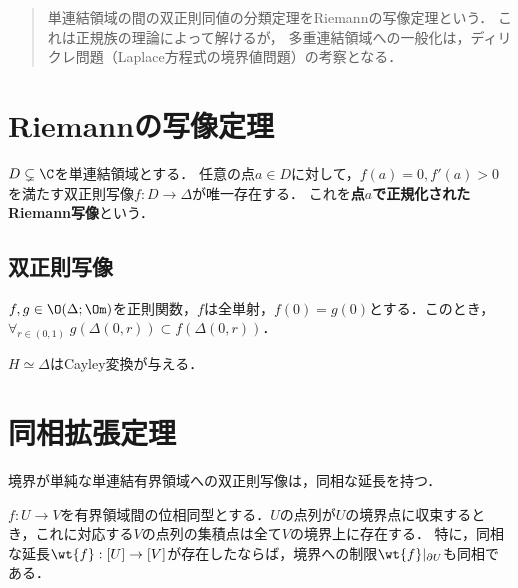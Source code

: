 \documentclass[uplatex, dvipdfmx]{jsreport}
\begin{document}
\begin{quotation}
    単連結領域の間の双正則同値の分類定理をRiemannの写像定理という．
    これは正規族の理論によって解けるが，
    多重連結領域への一般化は，ディリクレ問題（Laplace方程式の境界値問題）の考察となる．
\end{quotation}

\section{Riemannの写像定理}

\begin{theorem}
    $D\subsetneq\C$を単連結領域とする．
    任意の点$a\in D$に対して，$f(a)=0,f'(a)>0$を満たす双正則写像$f:D\to\Delta$が唯一存在する．
    これを\textbf{点$a$で正規化されたRiemann写像}という．
\end{theorem}

\subsection{双正則写像}

\begin{proposition}[双正則写像の描像]
    $f,g\in\O(\Delta;\Om)$を正則関数，$f$は全単射，$f(0)=g(0)$とする．このとき，$\forall_{r\in(0,1)}\;g(\Delta(0,r))\subset f(\Delta(0,r))$．
\end{proposition}

\begin{example}
    $H\simeq\Delta$はCayley変換が与える．

\end{example}

\section{同相拡張定理}

\begin{tcolorbox}[colframe=ForestGreen, colback=ForestGreen!10!white,breakable,colbacktitle=ForestGreen!40!white,coltitle=black,fonttitle=\bfseries\sffamily,
title=]
    境界が単純な単連結有界領域への双正則写像は，同相な延長を持つ．
\end{tcolorbox}

\begin{theorem}[連続写像の境界は境界に対応する]
    $f:U\to V$を有界領域間の位相同型とする．$U$の点列が$U$の境界点に収束するとき，これに対応する$V$の点列の集積点は全て$V$の境界上に存在する．
    特に，同相な延長$\wt{f}:[U]\to[V]$が存在したならば，境界への制限$\wt{f}|_{\partial U}$も同相である．
\end{theorem}
\end{document}
